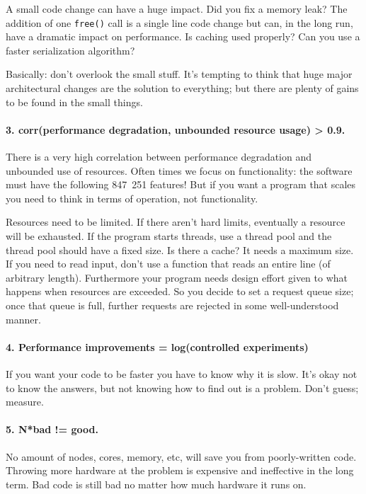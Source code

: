 \documentclass[a4paper]{report}
\begin{document}
A small code change can have a huge impact. Did you fix a memory leak? The addition of one \texttt{free()} call is a single line code change but can, in the long run, have a dramatic impact on performance. Is caching used properly? Can you use a faster serialization algorithm? 

Basically: don't overlook the small stuff. It's tempting to think that huge major architectural changes are the solution to everything; but there are plenty of gains to be found in the small things.

\paragraph{3. corr(performance degradation, unbounded resource usage) > 0.9.}
There is a very high correlation between performance degradation and unbounded use of resources. Often times we focus on functionality: the software must have the following 847~251 features! But if you want a program that scales you need to think in terms of operation, not functionality.

Resources need to be limited. If there aren't hard limits, eventually a resource will be exhausted. If the program starts threads, use a thread pool and the thread pool should have a fixed size. Is there a cache? It needs a maximum size. If you need to read input, don't use a function that reads an entire line (of arbitrary length). Furthermore your program needs design effort given to what happens when resources are exceeded. So you decide to set a request queue size; once that queue is full, further requests are rejected in some well-understood manner. 

\paragraph{4. Performance improvements = log(controlled experiments)}
If you want your code to be faster you have to know why it is slow. It's okay not to know the answers, but not knowing how to find out is a problem. Don't guess; measure.


\paragraph{5. N*bad != good.}
No amount of nodes, cores, memory, etc, will save you from poorly-written code. Throwing more hardware at the problem is expensive and ineffective in the long term. Bad code is still bad no matter how much hardware it runs on. 
\end{document}
